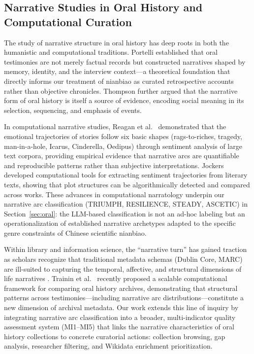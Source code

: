 \documentclass[review]{elsarticle}
\begin{document}
\subsection{Narrative Studies in Oral History and Computational Curation}

The study of narrative structure in oral history has deep roots in both the humanistic and computational traditions. Portelli \cite{portelli1991death} established that oral testimonies are not merely factual records but constructed narratives shaped by memory, identity, and the interview context---a theoretical foundation that directly informs our treatment of nianbiao as curated retrospective accounts rather than objective chronicles. Thompson \cite{thompson2000voice} further argued that the narrative form of oral history is itself a source of evidence, encoding social meaning in its selection, sequencing, and emphasis of events.

In computational narrative studies, Reagan et al.\ \cite{reagan2016emotional} demonstrated that the emotional trajectories of stories follow six basic shapes (rags-to-riches, tragedy, man-in-a-hole, Icarus, Cinderella, Oedipus) through sentiment analysis of large text corpora, providing empirical evidence that narrative arcs are quantifiable and reproducible patterns rather than subjective interpretations. Jockers \cite{jockers2015syuzhet} developed computational tools for extracting sentiment trajectories from literary texts, showing that plot structures can be algorithmically detected and compared across works. These advances in computational narratology underpin our narrative arc classification (TRIUMPH, RESILIENCE, STEADY, ASCETIC) in Section~\ref{sec:oral}: the LLM-based classification is not an ad-hoc labeling but an operationalization of established narrative archetypes adapted to the specific genre constraints of Chinese scientific nianbiao.

Within library and information science, the ``narrative turn'' has gained traction as scholars recognize that traditional metadata schemas (Dublin Core, MARC) are ill-suited to capturing the temporal, affective, and structural dimensions of life narratives \cite{sherratt2020biographical}. Trainin et al.\ \cite{trainin2026testimony} recently proposed a scalable computational framework for comparing oral history archives, demonstrating that structural patterns across testimonies---including narrative arc distributions---constitute a new dimension of archival metadata. Our work extends this line of inquiry by integrating narrative arc classification into a broader, multi-indicator quality assessment system (MI1--MI5) that links the narrative characteristics of oral history collections to concrete curatorial actions: collection browsing, gap analysis, researcher filtering, and Wikidata enrichment prioritization.
\end{document}
